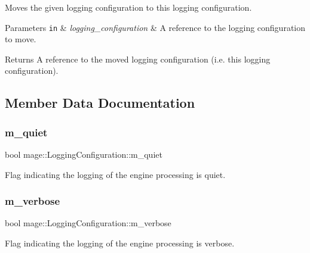 Moves the given logging configuration to this logging configuration.


\begin{DoxyParams}[1]{Parameters}
\mbox{\tt in}  & {\em logging\+\_\+configuration} & A reference to the logging configuration to move. \\
\hline
\end{DoxyParams}
\begin{DoxyReturn}{Returns}
A reference to the moved logging configuration (i.\+e. this logging configuration). 
\end{DoxyReturn}


\subsection{Member Data Documentation}
\hypertarget{structmage_1_1_logging_configuration_a38f457d5db84d15e008841ca8653b47c}{}\label{structmage_1_1_logging_configuration_a38f457d5db84d15e008841ca8653b47c} 
\subsubsection{\texorpdfstring{m\+\_\+quiet}{m\_quiet}}
{\footnotesize\ttfamily bool mage\+::\+Logging\+Configuration\+::m\+\_\+quiet\hspace{0.3cm}{\ttfamily [private]}}

Flag indicating the logging of the engine processing is quiet. \hypertarget{structmage_1_1_logging_configuration_a60f052c2bb702d8153188e93f00427ac}{}\label{structmage_1_1_logging_configuration_a60f052c2bb702d8153188e93f00427ac} 
\subsubsection{\texorpdfstring{m\+\_\+verbose}{m\_verbose}}
{\footnotesize\ttfamily bool mage\+::\+Logging\+Configuration\+::m\+\_\+verbose\hspace{0.3cm}{\ttfamily [private]}}

Flag indicating the logging of the engine processing is verbose. 